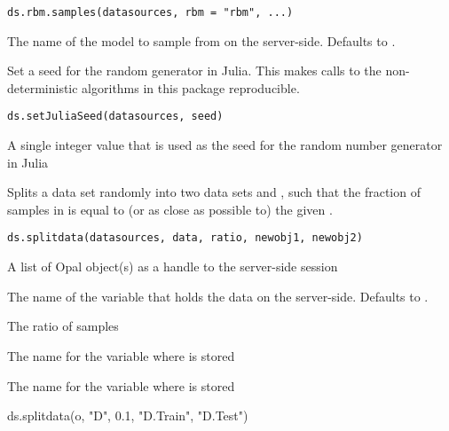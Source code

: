 %
\begin{Usage}
\begin{verbatim}
ds.rbm.samples(datasources, rbm = "rbm", ...)
\end{verbatim}
\end{Usage}
%
\begin{Arguments}
\begin{ldescription}
\item[\code{rbm}] The name of the model to sample from on the server-side. Defaults to .
\end{ldescription}
\end{Arguments}
%
\begin{Description}\relax
Set a seed for the random generator in Julia.
This makes calls to the non-deterministic algorithms in this package reproducible.
\end{Description}
%
\begin{Usage}
\begin{verbatim}
ds.setJuliaSeed(datasources, seed)
\end{verbatim}
\end{Usage}
%
\begin{Arguments}
\begin{ldescription}
\item[\code{seed}] A single integer value that is used as the seed for the random number generator in Julia
\end{ldescription}
\end{Arguments}
%
\begin{Description}\relax
Splits a data set randomly into two data sets  and , such that
the fraction of samples in  is equal to (or as close as possible to) the
given .
\end{Description}
%
\begin{Usage}
\begin{verbatim}
ds.splitdata(datasources, data, ratio, newobj1, newobj2)
\end{verbatim}
\end{Usage}
%
\begin{Arguments}
\begin{ldescription}
\item[\code{datasources}] A list of Opal object(s) as a handle to the server-side session

\item[\code{data}] The name of the variable that holds the data on the server-side. Defaults to .

\item[\code{ratio}] The ratio of samples

\item[\code{newobj1}] The name for the variable where  is stored

\item[\code{newobj2}] The name for the variable where  is stored
\end{ldescription}
\end{Arguments}
%
\begin{Examples}
\begin{ExampleCode}
    ds.splitdata(o, "D", 0.1, "D.Train", "D.Test")
\end{ExampleCode}
\end{Examples}
